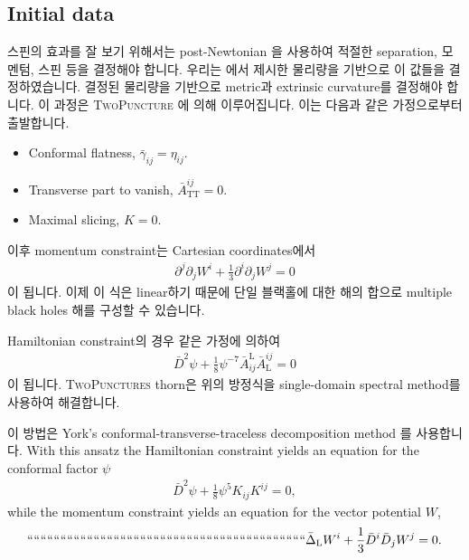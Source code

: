 \documentclass[]{article}
\begin{document}
\subsection{Initial data}

스핀의 효과를 잘 보기 위해서는 post-Newtonian 을 사용하여 적절한 separation, 모멘텀, 스핀 등을 결정해야 합니다. 우리는 \cite{Campanelli:2006uy}에서 제시한 물리량을 기반으로 이 값들을 결정하였습니다.
결정된 물리량을 기반으로 metric과 extrinsic curvature를 결정해야 합니다. 이 과정은 \textsc{TwoPuncture} \cite{Ansorg:2004ds}에 의해 이루어집니다. 이는 다음과 같은 가정으로부터 출발합니다.
\begin{itemize}
	
	\item Conformal flatness, $\bar{\gamma}_{ij} = \eta_{ij}$.
	\item Transverse part to vanish, $\bar{A}_\mathrm{TT}^{ij} = 0$.
	\item Maximal slicing, $K=0$.
	
\end{itemize}
이후 momentum constraint는 Cartesian coordinates에서
\begin{eqnarray}
	\partial^j \partial_j W^i + \frac{1}{3}\partial^i\partial_j W^j=0
\end{eqnarray}
이 됩니다. 이제 이 식은 linear하기 때문에 단일 블랙홀에 대한 해의 합으로 multiple black holes 해를 구성할 수 있습니다.

Hamiltonian constraint의 경우 같은 가정에 의하여
\begin{eqnarray}
	\bar{D}^2\psi + \frac{1}{8}\psi^{-7}\bar{A}^\mathrm{L}_{ij}\bar{A}^{ij}_\mathrm{L} = 0
\end{eqnarray}
이 됩니다. \textsc{TwoPunctures} thorn은 위의 방정식을 single-domain spectral method를 사용하여 해결합니다.




이 방법은 York’s conformal-transverse-traceless decomposition method 를 사용합니다. With this ansatz the Hamiltonian constraint yields an equation for the conformal factor $\psi$
\begin{eqnarray}
	\bar{D}^2\psi + \frac{1}{8}\psi^5 K_{ij}K^{ij} = 0,
\end{eqnarray}
while the momentum constraint yields an equation for the vector potential $W$,
\begin{eqnarray}
	````````````````````````````````````````````````````````````````````````````````````\bar{\Delta}_\mathrm{L} W^i + \frac{1}{3}\bar{D}^i\bar{D}_jW^j = 0.
\end{eqnarray}
\end{document}
